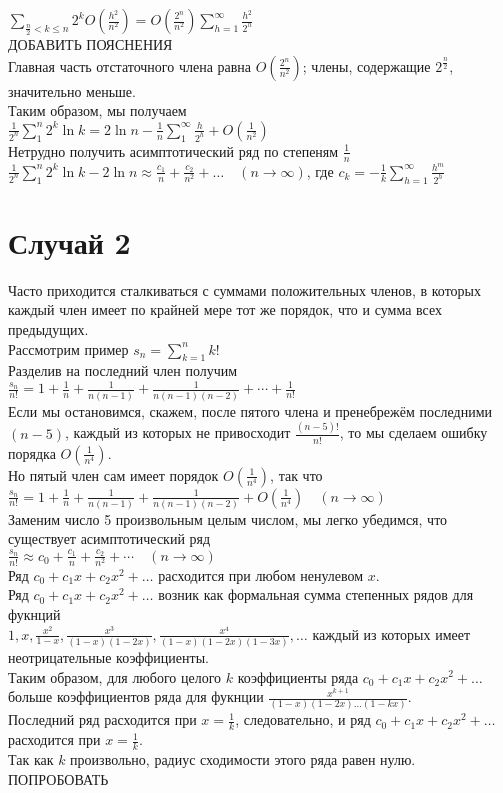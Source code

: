 \documentclass{report}
\begin{document}
$\sum_{\frac{n}{2}<k\le{n}}2^{k}O\left(\frac{h^{2}}{n^{2}}\right)=O\left(\frac{2^{n}}{n^{2}}\right)\sum_{h=1}^{\infty}\frac{h^{2}}{2^{h}}$ \\
ДОБАВИТЬ ПОЯСНЕНИЯ \\
Главная часть отстаточного члена равна $O(\frac{2^{n}}{n^{2}})$; члены, содержащие $2^\frac{n}{2}$, значительно меньше. \\
Таким образом, мы получаем \\
$\frac{1}{2^{n}}\sum_{1}^{n}2^{k}\ln{k}=2\ln{n}-\frac{1}{n}\sum_{1}^{\infty}\frac{h}{2^{h}}+O\left(\frac{1}{n^{2}}\right)$ \\
Нетрудно получить асимптотический ряд по степеням $\frac{1}{n}$ \\
$\frac{1}{2^{n}}\sum_{1}^{n}2^{k}\ln{k}-2\ln{n}\approx \frac{c_1}{n}+\frac{c_2}{n^{2}}+\dots\quad(n\to\infty)$, где $c_k=-\frac{1}{k}\sum_{h=1}^{\infty}\frac{h^m}{2^{h}}$ \\
\newpage
\section{Случай 2}
Часто приходится сталкиваться с суммами положительных членов, в которых каждый член имеет по крайней мере тот же порядок, что и сумма всех предыдущих. \\
Рассмотрим пример $s_n=\sum_{k=1}^{n}k!$ \\
Разделив на последний член получим \\
$\frac{s_n}{n!}=1+\frac{1}{n}+\frac{1}{n(n-1)}+\frac{1}{n(n-1)(n-2)}+\cdots+\frac{1}{n!}$ \\
Если мы остановимся, скажем, после пятого члена и пренебрежём последними $(n-5)$, каждый из которых не привосходит $\frac{(n-5)!}{n!}$, то мы сделаем ошибку порядка $O\left(\frac{1}{n^4}\right)$. \\
Но пятый член сам имеет порядок $O\left(\frac{1}{n^{4}}\right)$, так что \\
$\frac{s_n}{n!}=1+\frac{1}{n}+\frac{1}{n(n-1)}+\frac{1}{n(n-1)(n-2)}+O\left(\frac{1}{n^4}\right)\quad(n\to\infty)$ \\
Заменим число 5 произвольным целым числом, мы легко убедимся, что существует асимптотический ряд \\
$\frac{s_n}{n!}\approx c_0+\frac{c_1}{n}+\frac{c_2}{n^2}+\cdots\quad(n\to\infty)$ \\
Ряд $c_0+c_1x+c_2x^2+\dots$ расходится при любом ненулевом $x$. \\
Ряд $c_0+c_1x+c_2x^2+\dots$ возник как формальная сумма степенных рядов для фукнций \\
$1,x,\frac{x^2}{1-x},\frac{x^3}{(1-x)(1-2x)},\frac{x^4}{(1-x)(1-2x)(1-3x)},\dots$ каждый из которых имеет неотрицательные коэффициенты. \\
Таким образом, для любого целого $k$ коэффициенты ряда $c_0+c_1x+c_2x^2+\dots$ больше коэффициентов ряда для фукнции $\frac{x^{k+1}}{(1-x)(1-2x)\dots(1-kx)}$. \\
Последний ряд расходится при $x=\frac{1}{k}$, следовательно, и ряд $c_0+c_1x+c_2x^2+\dots$ расходится при $x=\frac{1}{k}$. \\
Так как $k$ произвольно, радиус сходимости этого ряда равен нулю. \\
ПОПРОБОВАТЬ \\
\newpage
\end{document}

